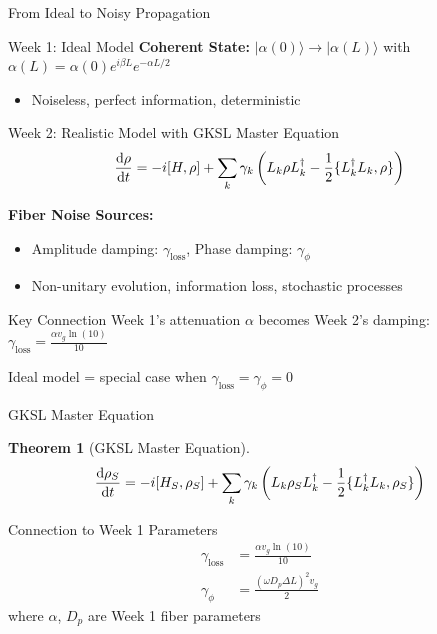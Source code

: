\documentclass{beamer}
\theoremstyle{definition}
\theoremstyle{plain}
\newtheorem{thm}{Theorem}[section]
\begin{document}
\begin{frame}{From Ideal to Noisy Propagation}
\footnotesize

\begin{block}{Week 1: Ideal Model}
\textbf{Coherent State:} $|\alpha(0)\rangle \to |\alpha(L)\rangle$ with $\alpha(L) = \alpha(0)e^{i\beta L}e^{-\alpha L/2}$
\begin{itemize}
    \item Noiseless, perfect information, deterministic
\end{itemize}
\end{block}

\vspace{0.2cm}

\begin{block}{Week 2: Realistic Model with GKSL Master Equation}
\[
\dv{\rho}{t} = -i[H,\rho] + \sum_k \gamma_k\left(L_k \rho L_k^\dagger - \frac{1}{2}\{L_k^\dagger L_k, \rho\}\right)
\]

\textbf{Fiber Noise Sources:}
\begin{itemize}
    \item Amplitude damping: $\gamma_{\text{loss}}$, Phase damping: $\gamma_\phi$
    \item Non-unitary evolution, information loss, stochastic processes
\end{itemize}
\end{block}

\vspace{0.2cm}

\begin{alertblock}{Key Connection}
Week 1's attenuation $\alpha$ becomes Week 2's damping: $\gamma_{\text{loss}} = \frac{\alpha v_g \ln(10)}{10}$

Ideal model = special case when $\gamma_{\text{loss}} = \gamma_\phi = 0$
\end{alertblock}

\end{frame}

\begin{frame}{GKSL Master Equation}
    \begin{thm}[GKSL Master Equation]
        \[
        \dv{\rho_S}{t} = -i[H_S, \rho_S] + \sum_{k} \gamma_k \left( L_k \rho_S L_k^\dagger - \frac{1}{2} \{L_k^\dagger L_k, \rho_S\} \right)
        \]
    \end{thm}
    
    \begin{block}{Connection to Week 1 Parameters}
        \begin{align*}
            \gamma_{\text{loss}} &= \frac{\alpha v_g \ln(10)}{10} \\
            \gamma_\phi &= \frac{(\omega D_p \Delta L)^2 v_g}{2}
        \end{align*}
        where $\alpha$, $D_p$ are Week 1 fiber parameters
    \end{block}
\end{frame}
\end{document}
